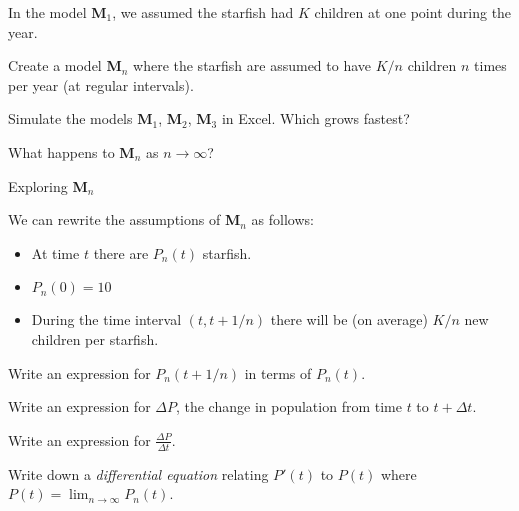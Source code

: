 \documentclass{workbook}
\begin{document}
\begin{slide}
	\question
	In the model \textbf{M$_1$}, we assumed the starfish had $K$ children at one point during the year.

	\begin{parts}
		\item Create a model \textbf{M$_n$} where the starfish are assumed to have $K/n$ children $n$ times per year (at regular intervals).
		\item Simulate the models \textbf{M$_1$}, \textbf{M$_2$}, \textbf{M$_3$} in Excel. Which grows fastest?
		\item What happens to \textbf{M$_n$} as $n\to\infty$?
	\end{parts}

\end{slide}

\begin{slide}
	\question
	Exploring \textbf{M$_n$}

	We can rewrite the assumptions of \textbf{M$_n$} as follows:
	\begin{itemize}
		\item At time $t$ there are $P_n(t)$ starfish.
		\item $P_n(0)=10$
		\item During the time interval $(t, t+1/n)$ there will be (on average) $K/n$ new children per starfish.
	\end{itemize}

	\begin{parts}
		\item Write an expression for $P_n(t+1/n)$ in terms of $P_n(t)$.
		\item Write an expression for $\Delta P$, the change in population from time $t$ to $t+\Delta t$.
		\item Write an expression for $\frac{\Delta P}{\Delta t}$.
		\item Write down a \emph{differential equation} relating $P'(t)$ to $P(t)$ where $\displaystyle P(t)=\lim_{n\to\infty} P_n(t)$.
	\end{parts}
\end{slide}
\end{document}
